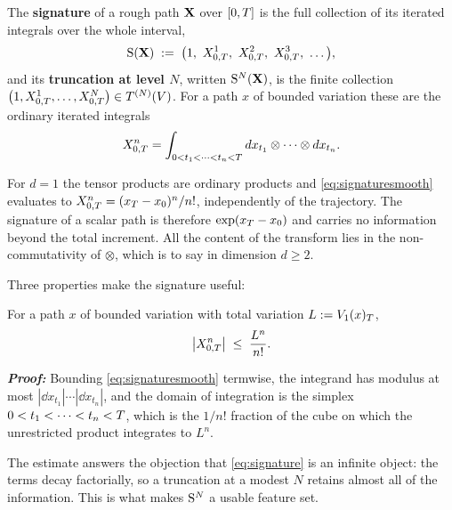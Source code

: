 \begin{definition}[Signature]\label{def:signature}
The \textbf{signature} of a rough path $\mathbf{X}$ over $[0,T]$ is the full collection of its iterated
integrals over the whole interval,
\begin{equation}\label{eq:signature}
\Sig(\rpX) \;:=\; \bigl(1,\ X^1_{0,\Mat},\ X^2_{0,\Mat},\ X^3_{0,\Mat},\ \dots\bigr),
\end{equation}
and its \textbf{truncation at level $N$}, written $\mathrm{S}^N(\mathbf{X})$, is the finite collection
$\bigl(1, X^1_{0,T},\dots,X^N_{0,T}\bigr) \in T^{(N)}(V)$. For a path $x$ of bounded
variation these are the ordinary iterated integrals
\begin{equation}\label{eq:signaturesmooth}
X^n_{0,T} = \int_{0<t_1<\cdots<t_n<T} d x_{t_1}\otimes\cdots\otimes d x_{t_n}.
\end{equation}
\end{definition}

\begin{example}\label{ex:signatureonedim}
For $d=1$ the tensor products are ordinary products and \eqref{eq:signaturesmooth} evaluates to
$X^n_{0,T} = (x_T - x_0)^n/n!$, independently of the trajectory. The signature of a scalar
path is therefore $\exp(x_T - x_0)$ and carries no information beyond the total increment. All
the content of the transform lies in the non-commutativity of $\otimes$, which is to say in
dimension $d\geq2$.
\end{example}

Three properties make the signature useful:

\begin{proposition}\label{prop:factorialdecay}
For a path $x$ of bounded variation with total variation $L := V_1(x)_T$,
\begin{equation}\label{eq:factorialdecay}
\bigl| X^n_{0,T} \bigr| \;\leq\; \frac{L^n}{n!} .
\end{equation}
\end{proposition}

\textbf{\textit{Proof:}} Bounding \eqref{eq:signaturesmooth} termwise, the integrand has modulus at
most $|\dd x_{t_1}|\cdots|\dd x_{t_n}|$, and the domain of integration is the simplex
$0<t_1<\cdots<t_n<T$, which is the $1/n!$ fraction of the cube on which the unrestricted product
integrates to $L^n$. \qedfilledtext

\medskip

The estimate answers the objection that \eqref{eq:signature} is an infinite object: the terms decay
factorially, so a truncation at a modest $N$ retains almost all
of the information. This is what makes $\mathrm{S}^N$ a usable feature set.

